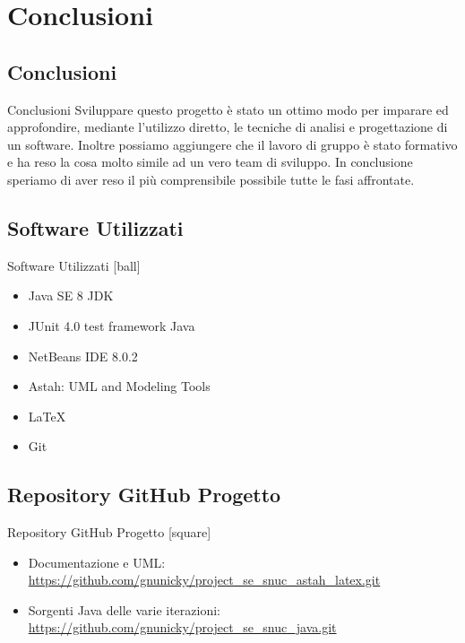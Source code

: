 \section {Conclusioni}
\subsection{Conclusioni}
 \begin{frame} {Conclusioni}
  Sviluppare questo progetto è stato un ottimo modo per imparare ed approfondire, mediante l'utilizzo diretto, le tecniche di analisi e progettazione di un software.   
  Inoltre possiamo aggiungere che il lavoro di gruppo è stato formativo e ha reso la cosa molto simile ad un vero team di sviluppo. In conclusione speriamo di aver 
  reso il più comprensibile possibile tutte le fasi affrontate.
 \end{frame}

\subsection{Software Utilizzati}
 \begin{frame} {Software Utilizzati}
  [ball]
  \begin{itemize} 
    \item Java SE 8 JDK
    \item JUnit 4.0 test framework Java
    \item NetBeans IDE 8.0.2 
    \item Astah: UML and Modeling Tools
    \item \LaTeX
    \item Git
   \end{itemize}
 \end{frame}

\subsection{Repository GitHub Progetto}
 \begin{frame} {Repository GitHub Progetto}
  [square]
  \begin{itemize} 
    \item Documentazione e UML: 
     \newline
     \url{https://github.com/gnunicky/project_se_snuc_astah_latex.git}
    \item Sorgenti Java delle varie iterazioni: 
     \newline
     \url{https://github.com/gnunicky/project_se_snuc_java.git}
   \end{itemize}
 \end{frame}


